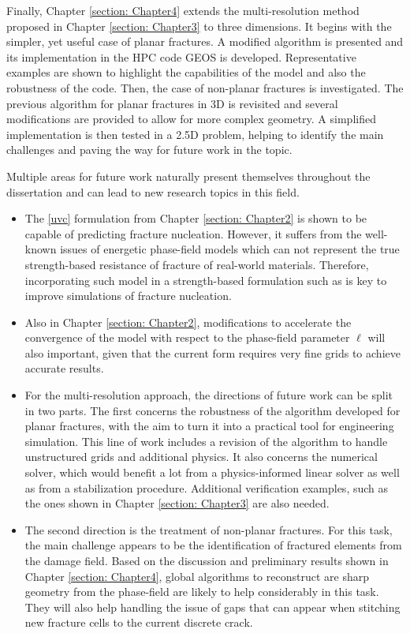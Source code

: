Finally, Chapter \ref{section: Chapter4} extends the multi-resolution method proposed in Chapter \ref{section: Chapter3} to three dimensions. It begins with the simpler, yet useful case of planar fractures. A modified algorithm is presented and its implementation in the HPC code GEOS is developed. Representative examples are shown to highlight the capabilities of the model and also the robustness of the code. Then, the case of non-planar fractures is investigated. The previous algorithm for planar fractures in 3D is revisited and several modifications are provided to allow for more complex geometry. A simplified implementation is then tested in a 2.5D problem, helping to identify the main challenges and paving the way for future work in the topic.

Multiple areas for future work naturally present themselves throughout the dissertation and can lead to new research topics in this field.

\begin{itemize}
    \item The \eqref{uvc} formulation from Chapter \ref{section: Chapter2} is shown to be capable of predicting fracture nucleation. However, it suffers from the well-known issues of energetic phase-field models which can not represent the true strength-based resistance of fracture of real-world materials. Therefore, incorporating such model in a strength-based formulation such as \cite{kumar2020revisiting} is key to improve simulations of fracture nucleation. 
    
    \item Also in Chapter \ref{section: Chapter2}, modifications to accelerate the convergence of the model with respect to the phase-field parameter $\ell$ will also important, given that the current form requires very fine grids to achieve accurate results.
    
    \item For the multi-resolution approach, the directions of future work can be split in two parts. The first concerns the robustness of the algorithm developed for planar fractures, with the aim to turn it into a practical tool for engineering simulation. This line of work includes a revision of the algorithm to handle unstructured grids and additional physics. It also concerns the numerical solver, which would benefit a lot from a physics-informed linear solver as well as from a stabilization procedure. Additional verification examples, such as the ones shown in Chapter \ref{section: Chapter3} are also needed.
    
    \item The second direction is the treatment of non-planar fractures. For this task, the main challenge appears to be the identification of fractured elements from the damage field. Based on the discussion and preliminary results shown in Chapter \ref{section: Chapter4}, global algorithms to reconstruct are sharp geometry from the phase-field are likely to help considerably in this task. They will also help handling the issue of gaps that can appear when stitching new fracture cells to the current discrete crack. 
\end{itemize}

